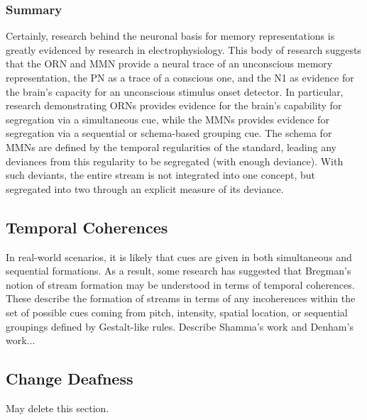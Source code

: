 \subsubsection{Summary}

Certainly, research behind the neuronal basis for memory representations is greatly evidenced by research in electrophysiology.  This body of research suggests that the ORN and MMN provide a neural trace of an unconscious memory representation, the PN as a trace of a conscious one, and the N1 as evidence for the brain's capacity for an unconscious stimulus onset detector.  In particular, research demonstrating ORNs provides evidence for the brain's capability for segregation via a simultaneous cue, while the MMNs provides evidence for segregation via a sequential or schema-based grouping cue.  The schema for MMNs are defined by the temporal regularities of the standard, leading any deviances from this regularity to be segregated (with enough deviance).  With such deviants, the entire stream is not integrated into one concept, but segregated into two through an explicit measure of its deviance.

\subsection{Temporal Coherences}

In real-world scenarios, it is likely that cues are given in both simultaneous and sequential formations.  As a result, some research has suggested that Bregman's notion of stream formation may be understood in terms of temporal coherences.  These describe the formation of streams in terms of any incoherences within the set of possible cues coming from pitch, intensity, spatial location, or sequential groupings defined by Gestalt-like rules.  Describe Shamma's work and Denham's work...


\subsection{Change Deafness}

May delete this section.

